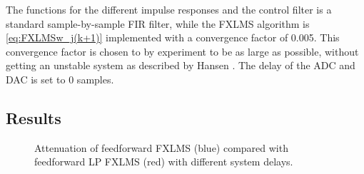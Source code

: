 The functions for the different impulse responses and the control filter is a standard sample-by-sample FIR filter, while the FXLMS algorithm is \autoref{eq:FXLMSw_j(k+1)} implemented with a convergence factor of 0.005. This convergence factor is chosen to by experiment to be as large as possible, without getting an unstable system as described by Hansen \cite{Hansen2}. The delay of the ADC and DAC is set to 0 samples.

\subsection{Results}

\begin{figure}[H]
	\centering
	
	\caption{Attenuation of feedforward FXLMS (blue) compared with feedforward LP FXLMS (red) with different system delays.}
	\label{Fig:delayRatioAppendix}
\end{figure}


